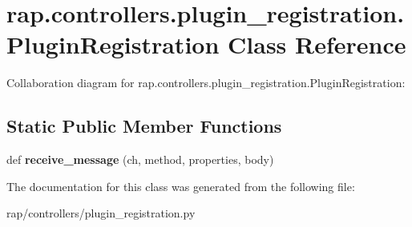 \hypertarget{classrap_1_1controllers_1_1plugin__registration_1_1PluginRegistration}{}\section{rap.\+controllers.\+plugin\+\_\+registration.\+Plugin\+Registration Class Reference}
\label{classrap_1_1controllers_1_1plugin__registration_1_1PluginRegistration}


Collaboration diagram for rap.\+controllers.\+plugin\+\_\+registration.\+Plugin\+Registration\+:
\subsection*{Static Public Member Functions}
\begin{DoxyCompactItemize}
\item 
\mbox{\label{classrap_1_1controllers_1_1plugin__registration_1_1PluginRegistration_afeda2a0a9ae4454a8c27a1ac11f31f92}} 
def {\bfseries receive\+\_\+message} (ch, method, properties, body)
\end{DoxyCompactItemize}


The documentation for this class was generated from the following file\+:\begin{DoxyCompactItemize}
\item 
rap/controllers/plugin\+\_\+registration.\+py\end{DoxyCompactItemize}
